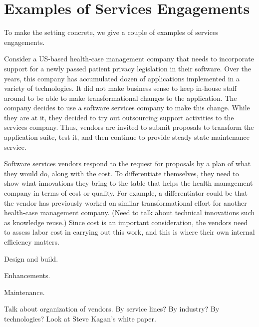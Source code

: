 \section{Examples of Services Engagements}

To make the setting concrete, we give a couple of examples of services engagements. 

Consider a US-based health-case management company that needs to incorporate support for a newly passed patient privacy legislation in their software. Over the years, this company has accumulated dozen of applications implemented in a variety of technologies. It did not make business sense to keep in-house staff around to be able to make transformational changes to the application. The company decides to use a software services company to make this change. While they are at it, they decided to try out outsourcing support activities to the services company.  Thus, vendors are invited to submit proposals to transform the application suite, test it, and then continue to provide steady state maintenance service.

Software services vendors respond to the request for proposals by a plan of what they would do, along with the cost. To differentiate themselves, they need to show what innovations they bring to the table that helps the health management company in terms of cost or quality. For example, a differentiator could be that the vendor has previously worked on similar transformational effort for another health-case management company. (Need to talk about technical innovations such as knowledge reuse.) Since cost is an important consideration, the vendors need to assess labor cost in carrying out this work, and this is where their own internal efficiency matters.


Design and build.

Enhancements.

Maintenance.

Talk about organization of vendors. By service lines? By industry? By technologies? Look at Steve Kagan's white paper.
